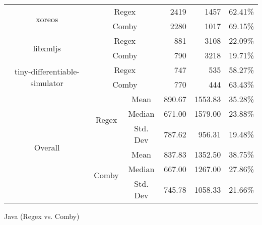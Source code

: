 \documentclass[sigconf,review, anonymous]{acmart}
\begin{document}
{\begin{table}[hbtp]
{\begin{tabular}{|c|c|c|r|r|r|}
\multirow{2}{*}{xoreos} & \multicolumn{2}{c|}{Regex} & 2419 \hspace{8pt} & 1457 \hspace{8pt} & 62.41\% \\\cline{2-6}
    & \multicolumn{2}{c|}{Comby} & 2280 \hspace{8pt} & 1017 \hspace{8pt} & 69.15\% \\ \hline
\multirow{2}{*}{libxmljs} & \multicolumn{2}{c|}{Regex} & 881 \hspace{8pt} & 3108 \hspace{8pt} & 22.09\% \\\cline{2-6}
    & \multicolumn{2}{c|}{Comby} & 790 \hspace{8pt} & 3218 \hspace{8pt} & 19.71\% \\ \hline
\multirow{2}{*}{tiny-differentiable-simulator} & \multicolumn{2}{c|}{Regex} & 747 \hspace{8pt} & 535 \hspace{8pt} & 58.27\% \\\cline{2-6}
    & \multicolumn{2}{c|}{Comby} & 770 \hspace{8pt} & 444 \hspace{8pt} & 63.43\% \\ \hline

\multirow{6}{*}{Overall} & \multirow{3}{*}{Regex} & Mean & 890.67 &	1553.83 & 35.28\%\\\cline{3-6}
    &   &  Median & 671.00 & 1579.00 & 23.88\%  \\\cline{3-6}
    &   &  Std. Dev & 787.62 & 956.31 & 19.48\%  \\\cline{2-6}

 & \multirow{3}{*}{Comby} & Mean & 837.83 & 1352.50 & 38.75\% \\\cline{3-6}
    &   &  Median & 667.00 & 1267.00 & 27.86\%  \\\cline{3-6}
    &   &  Std. Dev & 745.78 & 1058.33	& 21.66\%  \\\hline

\end{tabular}
}

\end{table}

  

\begin{table}[hbtp]
\centering
\caption{Java (Regex vs. Comby)}
\label{tab:table_java1}
\resizebox{\columnwidth}{!}{%

}
\end{table}}
\end{document}
